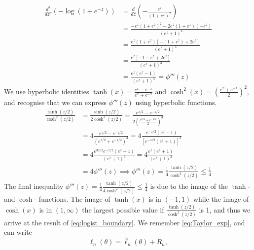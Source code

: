 \begin{equation*}
\begin{split}
    \frac{d^3}{dz^3}\left( -\log\left(1 + e^{-z}\right)\right) &= \frac{d}{dz}\left( - \frac{e^z}{\left(1 + e^z\right)^2}\right) \\
    & = \frac{- e^z \left(1 + e^z\right)^2 - 2e^z\left(1 + e^z\right)\left(-e^z\right)}{\left(e^z + 1\right)^4}\\
    &=\frac{e^z\left(1+e^z\right)\left[-\left(1 + e^z\right) + 2e^z\right]}{\left(e^z + 1\right)^4} \\
    &= \frac{e^z\left[-1 -e^z + 2e^z\right]}{\left(e^z + 1\right)^3} \\
    &= \frac{e^z \left(e^z -1\right)}{\left(e^z + 1 \right)^3} = \phi '''\left(z\right)
\end{split}
\end{equation*}   
We use hyperbolic identities $\tanh(x) =  \frac{e^x - e^{-x}}{e^x + e^{-x}}$ and $\cosh^2(x) = \left(\frac{e^x + e^{-x}}{2}\right)^2$, and recognise that we can express $\phi'''\left(z\right)$ using hyperbolic functions.
\begin{equation}\label{eq:logist_boundary}
\begin{split}
\frac{\tanh(z/2)}{\cosh^2(z/2)}  &= \frac{\sinh(z/2)}{2\cosh^3(z/2)} 
= \frac{e^{z/2} - e^{-z/2}}{2\left(\frac{e^{z/2} + e^{-z/2}}{2}\right)^3} \\
& = 4\frac{e^{z/2} - e^{-z/2}}{\left(e^{z/2} + e^{-z/2}\right)^3}
 = 4\frac{e^{-z/2}\left(e^z -1\right)}{\left[e^{-z/2}\left(e^z + 1\right)\right]^3} \\
& = 4\frac{e^{3z/2}e^{-z/2}\left(e^z+1\right)}{\left(e^z + 1\right)^3} 
 = 4 \frac{e^z\left(e^z + 1\right)}{\left(e^z +1 \right)^3} \\
& = 4\phi'''(z) 
\implies \phi'''(z) = \frac{1}{4}\frac{\tanh(z/2)}{\cosh^2(z/2)} \leq \frac{1}{4}
\end{split}
\end{equation}
The final inequality $\phi'''\left(z\right) = \frac{1}{4}\frac{\tanh\left(z/2\right)}{4\cosh^2\left(z/2\right)} \leq \frac{1}{4}$ is due to the image of the $\tanh$- and $\cosh$- functions.
The image of $\tanh\left(x\right)$ is in $\left(-1, 1\right)$  while the image of $\cosh\left(x\right)$ is in $\left(1, \infty\right)$ the largest possible value if $\frac{\tanh\left(z/2\right)}{\cosh^2\left(z/2\right)}$ is 1, and thus we arrive at the result of \eqref{eq:logist_boundary}.  
We remember \eqref{eq:Taylor_exp}, and can write 
\begin{equation}
    \ell_n\left(\theta\right) = \hat{\ell}_n\left(\theta\right) + R_n, 
\end{equation}
